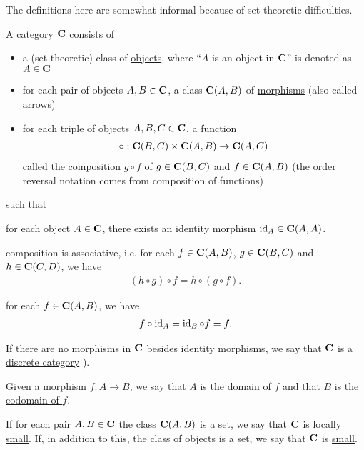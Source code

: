 \begin{note}
  The definitions here are somewhat informal because of set-theoretic difficulties.
\end{note}

\begin{definition}\label{def:category}\cite[definition 1.1.1]{Leinster2014}
  A \uline{category} $\operatorname{\mathbf{C}}$ consists of
  \begin{itemize}
    \item a (set-theoretic) class of \uline{objects}, where \enquote{$A$ is an object in $\operatorname{\mathbf{C}}$} is denoted as $A \in \operatorname{\mathbf{C}}$
    \item for each pair of objects $A, B \in \operatorname{\mathbf{C}}$, a class ${\operatorname{\mathbf{C}}}(A, B)$ of \uline{morphisms} (also called \uline{arrows})
    \item for each triple of objects $A, B, C \in \operatorname{\mathbf{C}}$, a function
    \begin{align*}
      \circ: {\operatorname{\mathbf{C}}}(B, C) \times {\operatorname{\mathbf{C}}}(A, B) \to {\operatorname{\mathbf{C}}}(A, C)
    \end{align*}
    called the composition $g \circ f$ of $g \in {\operatorname{\mathbf{C}}}(B, C)$ and $f \in {\operatorname{\mathbf{C}}}(A, B)$ (the order reversal notation comes from composition of functions)
  \end{itemize}
  such that
  \begin{defenum}
    \item for each object $A \in \operatorname{\mathbf{C}}$, there exists an identity morphism $\operatorname{id}_A \in {\operatorname{\mathbf{C}}}(A, A)$.
    \item composition is associative, i.e. for each $f \in {\operatorname{\mathbf{C}}}(A, B)$, $g \in {\operatorname{\mathbf{C}}}(B, C)$ and $h \in {\operatorname{\mathbf{C}}}(C, D)$, we have
    \begin{align*}
      (h \circ g) \circ f = h \circ (g \circ f).
    \end{align*}
    \item for each $f \in {\operatorname{\mathbf{C}}}(A, B)$, we have
    \begin{align*}
      f \circ \operatorname{id}_A = \operatorname{id}_B \circ f = f.
    \end{align*}
  \end{defenum}

  If there are no morphisms in $\operatorname{\mathbf{C}}$ besides identity morphisms, we say that $\operatorname{\mathbf{C}}$ is a \uline{discrete category} \cite[example 1.1.18(b]{Leinster2014}).

  Given a morphism $f: A \to B$, we say that $A$ is the \uline{domain of $f$} and that $B$ is the \uline{codomain of $f$}.

  If for each pair $A, B \in \operatorname{\mathbf{C}}$ the class $\operatorname{\mathbf{C}}(A, B)$ is a set, we say that $\operatorname{\mathbf{C}}$ is \uline{locally small}. If, in addition to this, the class of objects is a set, we say that $\operatorname{\mathbf{C}}$ is \uline{small}.
\end{definition}

